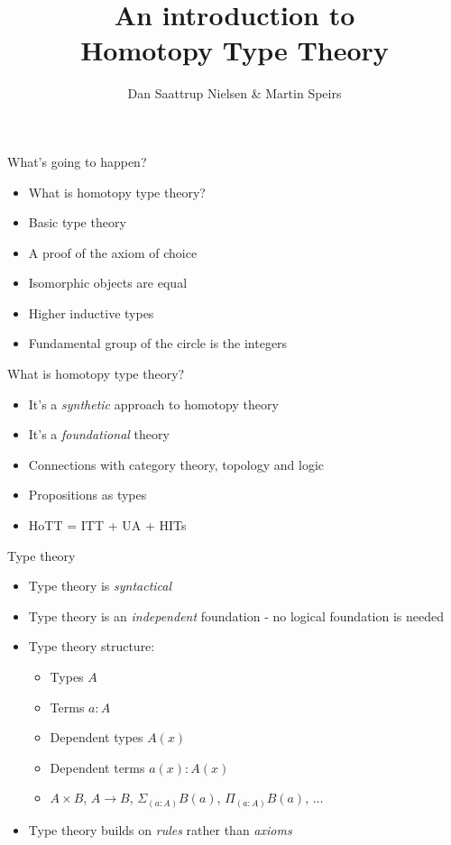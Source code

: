 \documentclass{beamer}
\title[Homotopy Type Theory]{
	An introduction to\\
	Homotopy Type Theory\\
}
\author{Dan Saattrup Nielsen \& Martin Speirs}
\date{}
\begin{document}
\begin{frame}
	\titlepage
\end{frame}

\begin{frame}{What's going to happen?}
	\begin{itemize}
	\pause\item What is homotopy type theory?
	\pause\item Basic type theory
	\pause\item A proof of the axiom of choice
	\pause\item Isomorphic objects are equal
	\pause\item Higher inductive types
	\pause\item Fundamental group of the circle is the integers
	\end{itemize}
\end{frame}

\begin{frame}{What is homotopy type theory?}
	\begin{itemize}
	\item It's a \textit{synthetic} approach to homotopy theory
	\pause\item It's a \textit{foundational} theory
	\pause\item Connections with category theory, topology and logic
	\pause\item Propositions as types
	\pause\item HoTT = ITT + UA + HITs
	\end{itemize}
\end{frame}

\begin{frame}{Type theory}
	\begin{itemize}
	\pause\item Type theory is \textit{syntactical}
	\pause\item Type theory is an \textit{independent} foundation - no logical foundation is needed
	\pause\item Type theory structure:
	\begin{itemize}
		\pause\item Types $A$
		\pause\item Terms $a:A$
		\pause\item Dependent types $A(x)$
		\pause\item Dependent terms $a(x):A(x)$
		\pause\item $A\times B$, $A\to B$, $\Sigma_{(a:A)}B(a)$, $\Pi_{(a:A)}B(a)$, $\hdots$
	\end{itemize}
	\pause\item Type theory builds on \textit{rules} rather than \textit{axioms}
	\end{itemize}
\end{frame}
\end{document}
